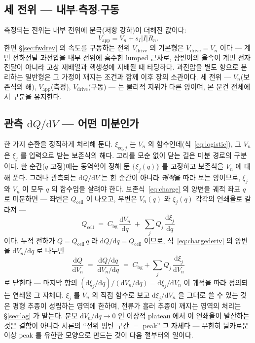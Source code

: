 \documentclass[11pt,a4paper]{article}
\newcommand{\dd}{\mathrm{d}}
\newcommand{\eq}{\mathrm{eq}}
\newcommand{\app}{\mathrm{app}}
\newcommand{\drive}{\mathrm{drive}}
\newcommand{\cell}{\mathrm{cell}}
\newcommand{\bg}{\mathrm{bg}}
\begin{document}
\subsection{세 전위 — 내부$\cdot$측정$\cdot$구동}
측정되는 전위는 내부 전위에 분극(저항 강하)이 더해진 값이다:
\begin{equation}
V_\app=V_n+s_I|I|R_n.
\label{eq:vapp}
\end{equation}
한편 \S\ref{sec:fwdrev} 의 속도를 구동하는 전위 $V_\drive$ 의 기본형은 $V_\drive=V_n$ 이다 — 계면
전하전달 과전압을 내부 전위에 흡수한 lumped 근사로, 상변이의 율속이 계면 전자전달이 아니라 고상 재배열과
핵생성에 지배될 때 타당하다. 과전압을 별도 항으로 분리하는 일반형은 그 가정이 깨지는 조건과 함께 이후 장의
소관이다. 세 전위 — $V_n$(보존식의 해), $V_\app$(측정), $V_\drive$(구동) — 는 물리적 지위가 다른 양이며,
본 문건 전체에서 구분을 유지한다.

\subsection{관측 $\dd Q/\dd V$ — 어떤 미분인가}
한 가지 순환을 정직하게 처리해 둔다. $\xi_{\eq,j}$ 는 $V_n$ 의 함수인데(식~\eqref{eq:logistic}), 그
$V_n$ 은 $\xi_j$ 를 입력으로 받는 보존식의 해다. 고리를 모순 없이 닫는 길은 미분 경로의 구분이다. 한
순간($q$ 고정)에는 동역학이 정해 둔 $\{\xi_j(q)\}$ 를 고정하고 보존식을 $V_n$ 에 대해 푼다. 그러나
관측되는 $\dd Q/\dd V$ 는 한 순간이 아니라 \emph{궤적}을 따라 보는 양이므로, $\xi_j$ 와 $V_n$ 이 모두
$q$ 의 함수임을 살려야 한다. 보존식~\eqref{eq:charge} 의 양변을 궤적 좌표 $q$ 로 미분하면 — 좌변은
$Q_\cell$ 이 나오고, 우변은 $V_n(q)$ 와 $\xi_j(q)$ 각각의 연쇄율로 갈라져 —
\begin{equation}
Q_\cell\;=\;C_\bg\,\frac{\dd V_n}{\dd q}\;+\;\sum_jQ_j\,\frac{\dd\xi_j}{\dd q}
\label{eq:chargederiv}
\end{equation}
이다. 누적 전하가 $Q=Q_\cell\,q$ 라 $\dd Q/\dd q=Q_\cell$ 이므로, 식~\eqref{eq:chargederiv} 의
양변을 $\dd V_n/\dd q$ 로 나누면
\begin{equation}
\frac{\dd Q}{\dd V_n}\;=\;\frac{\dd Q/\dd q}{\dd V_n/\dd q}
\;=\;C_\bg+\sum_jQ_j\,\frac{\dd\xi_j}{\dd V_n}
\label{eq:dQdV}
\end{equation}
로 닫힌다 — 마지막 항의 $(\dd\xi_j/\dd q)/(\dd V_n/\dd q)=\dd\xi_j/\dd V_n$ 이 궤적을 따라
정의되는 연쇄율 그 자체다. $\xi_j$ 를 $V_n$ 의
직접 함수로 보고 $\dd\xi_j/\dd V_n$ 을 그대로 쓸 수 있는 것은 평형 추종이 성립하는 영역에 한하며, 전류가
흘러 추종이 깨지는 영역의 처리는 \S\ref{sec:lag} 가 맡는다. 분모 $\dd V_n/\dd q\to0$ 인 이상적
plateau 에서 이 연쇄율이 발산하는 것은 결함이 아니라 서론의 ``전위 평탄 구간 $=$ peak'' 그 자체다 — 무한히
날카로운 이상 peak 를 유한한 모양으로 만드는 것이 다음 절부터의 일이다.
\end{document}
